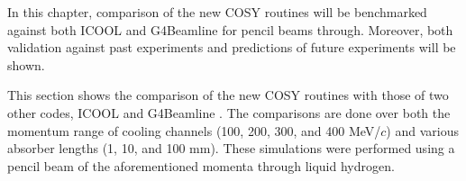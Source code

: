 \par In this chapter, comparison of the new COSY routines will be benchmarked against both ICOOL and G4Beamline for pencil beams through. Moreover, both validation against past experiments and predictions of future experiments will be shown.

\label{sec:benchmark}

This section shows the comparison of the new COSY routines with those of two other codes, ICOOL \cite{icool} and G4Beamline \cite{g4bl}. The comparisons are done over both the momentum range of cooling channels (100, 200, 300, and 400 MeV/$c$) and various absorber lengths (1, 10, and 100 mm). These simulations were performed using a pencil beam of the aforementioned momenta through liquid hydrogen.

\newpage

\iftrue %

